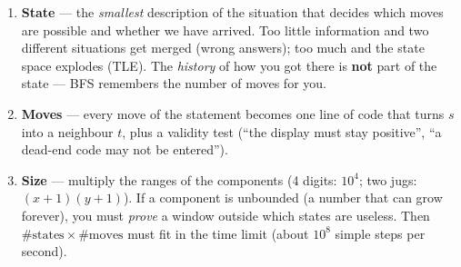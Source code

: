 \begin{diagrambox}
\end{diagrambox}

\begin{enumerate}[leftmargin=*]
    \item \textbf{State} --- the \emph{smallest} description of the situation that decides which moves are possible and whether we have arrived. Too little information and two different situations get merged (wrong answers); too much and the state space explodes (TLE). The \emph{history} of how you got there is \textbf{not} part of the state --- BFS remembers the number of moves for you.
    \item \textbf{Moves} --- every move of the statement becomes one line of code that turns $s$ into a neighbour $t$, plus a validity test (``the display must stay positive'', ``a dead-end code may not be entered'').
    \item \textbf{Size} --- multiply the ranges of the components (4 digits: $10^4$; two jugs: $(x+1)(y+1)$). If a component is unbounded (a number that can grow forever), you must \emph{prove} a window outside which states are useless. Then $\#\text{states} \times \#\text{moves}$ must fit in the time limit (about $10^8$ simple steps per second).
\end{enumerate}

